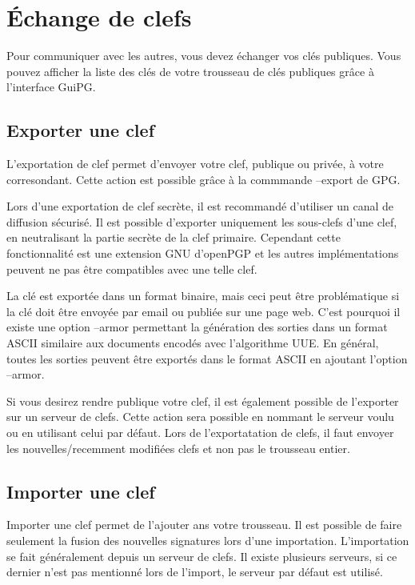 \section{Échange de clefs}

Pour communiquer avec les autres, vous devez échanger vos clés publiques. Vous pouvez afficher la liste des clés de votre trousseau de clés publiques grâce à l'interface
GuiPG.

\subsection{Exporter une clef}

L'exportation de clef permet d'envoyer votre clef, publique ou privée, à votre corresondant. Cette action est possible grâce à la commmande --export de GPG.

Lors d'une exportation de clef secrète, il est recommandé d'utiliser un canal de diffusion sécurisé. Il est possible d'exporter uniquement les sous-clefs d'une clef, en neutralisant la partie secrète de la clef primaire. Cependant cette fonctionnalité est une extension GNU d'openPGP et les autres implémentations peuvent ne pas être compatibles avec une telle clef.

La clé est exportée dans un format binaire, mais ceci peut être problématique si la clé doit être envoyée par email ou publiée sur une page web. C'est pourquoi il existe une option --armor permettant la génération des sorties dans un format ASCII similaire aux documents encodés avec l'algorithme UUE. En général, toutes les sorties peuvent être exportés dans le format ASCII en ajoutant l'option --armor.

Si vous desirez rendre publique votre clef, il est également possible de l'exporter sur un serveur de clefs. Cette action sera possible en nommant le serveur voulu ou en utilisant celui par défaut. Lors de l'exportatation de clefs, il faut envoyer les nouvelles/recemment modifiées clefs et non pas le trousseau entier.

\subsection{Importer une clef}

Importer une clef permet de l'ajouter ans votre trousseau. Il est possible de faire seulement la fusion des nouvelles signatures lors d'une importation.
L'importation se fait généralement depuis un serveur de clefs. Il existe plusieurs serveurs, si ce dernier n'est pas mentionné lors de l'import, le serveur par défaut est utilisé.

